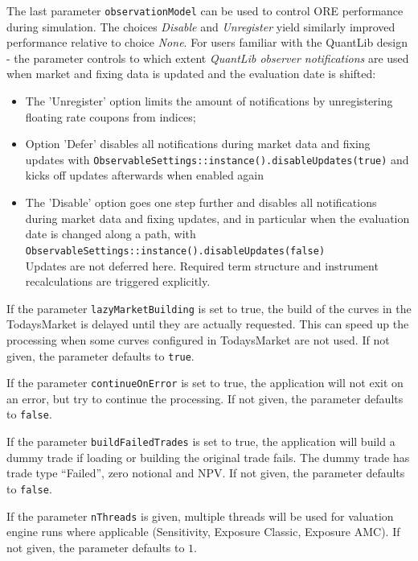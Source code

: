\documentclass[12pt, a4paper]{article}
\begin{document}
\medskip The last parameter {\tt observationModel} can be used to control ORE performance during simulation. The choices
{\em Disable } and {\em Unregister } yield similarly improved performance relative to choice {\em None}. For users
familiar with the QuantLib design - the parameter controls to which extent {\em QuantLib observer notifications} are
used when market and fixing data is updated and the evaluation date is shifted:
\begin{itemize}
\item The 'Unregister' option limits the amount of notifications by unregistering floating rate coupons from indices;
\item Option 'Defer' disables all notifications during market data and fixing updates with
{\tt ObservableSettings::instance().disableUpdates(true)}
and kicks off updates afterwards when enabled again
\item The 'Disable' option goes one step further and disables all notifications during market data and fixing updates,
  and in particular when the evaluation date is changed along a path, with \\
  {\tt ObservableSettings::instance().disableUpdates(false)} \\
  Updates are not deferred here. Required term structure and instrument recalculations are triggered explicitly.
\end{itemize}

\medskip If the parameter {\tt lazyMarketBuilding} is set to true, the build of the curves in the TodaysMarket is
delayed until they are actually requested. This can speed up the processing when some curves configured in TodaysMarket
are not used. If not given, the parameter defaults to {\tt true}.

\medskip If the parameter {\tt continueOnError} is set to true, the application will not exit on an error, but try to
continue the processing. If not given, the parameter defaults to {\tt false}.

\medskip If the parameter {\tt buildFailedTrades} is set to true, the application will build a dummy trade if loading or
building the original trade fails. The dummy trade has trade type ``Failed'', zero notional and NPV.
If not given, the parameter defaults to {\tt false}.

\medskip If the parameter {\tt nThreads} is given, multiple threads will be used for valuation engine runs where
applicable (Sensitivity, Exposure Classic, Exposure AMC). If not given, the parameter defaults to $1$.
\end{document}
